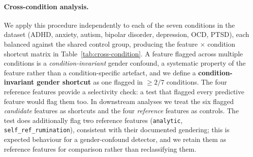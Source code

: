 \documentclass[11pt]{article}
\begin{document}
\paragraph{Cross-condition analysis.}
We apply this procedure independently to each of the seven conditions in the dataset (ADHD, anxiety, autism, bipolar disorder, depression, OCD, PTSD), each balanced against the shared control group, producing the feature $\times$ condition shortcut matrix in Table~\ref{tab:cross-condition}. A feature flagged across multiple conditions is a \emph{condition-invariant} gender confound, a systematic property of the feature rather than a condition-specific artefact, and we define a \textbf{condition-invariant gender shortcut} as one flagged in $\geq 2/7$ conditions. The four reference features provide a selectivity check: a test that flagged every predictive feature would flag them too. In downstream analyses we treat the six flagged \emph{candidate} features as shortcuts and the four \emph{reference} features as controls. The test does additionally flag two reference features (\texttt{analytic}, \texttt{self\_ref\_rumination}), consistent with their documented gendering; this is expected behaviour for a gender-confound detector, and we retain them as reference features for comparison rather than reclassifying them.
\end{document}
